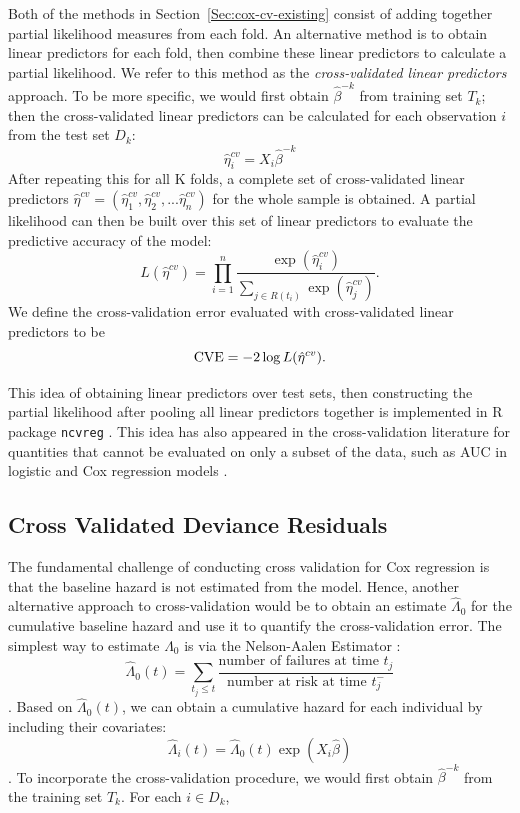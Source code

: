 \par Both of the methods in Section~\ref{Sec:cox-cv-existing} consist of adding together partial likelihood measures from each fold.  An alternative method is to obtain linear predictors for each fold, then combine these linear predictors to calculate a partial likelihood. We refer to this method as the \emph{cross-validated linear predictors} approach. To be more specific, we would first obtain $\hat{\beta}^{-k}$ from training set $T_{k}$; then the cross-validated linear predictors can be calculated for each observation $i$ from the test set $D_k$:  
\begin{equation}
  \label{eq:cv-lp}
  \hat{\eta}^{cv}_{i} = X_{i}\hat{\beta}^{-k}
\end{equation} 
After repeating this for all K folds, a complete set of cross-validated linear predictors $\hat{\eta}^{cv} = ( \hat{\eta}^{cv}_{1},  \hat{\eta}^{cv}_{2} , ...  \hat{\eta}^{cv}_{n})$ for the whole sample is obtained. A partial likelihood can then be built over this set of linear predictors to evaluate the predictive accuracy of the model: 
	\begin{equation} 
	L(\hat{\eta}^{cv}) = \prod_{i=1}^{n} \frac{\exp (\hat{\eta}^{cv}_{i})}{\sum_{ j \in R(t_{i})}\exp (\hat{\eta}^{cv}_{j})}.
	\end{equation}
We define the cross-validation error evaluated with cross-validated linear predictors to be $$\textrm{CVE} = - 2 \log L(\hat{\eta}^{cv}).$$
  
\par This idea of obtaining linear predictors over test sets, then constructing the partial likelihood after pooling all linear predictors together is implemented in R package \texttt{ncvreg} \citep{ncvreg}. This idea has also appeared in the cross-validation literature for quantities that cannot be evaluated on only a subset of the data, such as AUC in logistic and Cox regression models \citep{Parker2007,Simon2011a,Subramanian2011}.

\subsection{Cross Validated Deviance Residuals}

The fundamental challenge of conducting cross validation for Cox regression is that the baseline hazard is not estimated from the model. Hence, another alternative approach to cross-validation would be to obtain an estimate $\hat{\Lambda}_{0}$ for the cumulative baseline hazard and use it to quantify the cross-validation error. The simplest way to estimate $\Lambda_0$ is via the Nelson-Aalen Estimator \citep{aalen1978} \citep{nelson1969}:
$$
	 \hat{\Lambda}_{0}(t) = \sum_{t_j \leq t}\frac{\text{number of failures at time } t_j}{\text{number at risk at time }t^{-}_j}
$$.
Based on $\hat{\Lambda}_{0}(t)$, we can obtain a cumulative hazard for each individual by including their covariates: $$  \hat{\Lambda}_{i}(t) =  \hat{\Lambda}_{0}(t)\exp(X_i\hat\beta)$$. To incorporate the cross-validation procedure, we would first obtain $\hat{\beta}^{-k}$ from the training set $T_k$. For each $i \in D_k$, 

